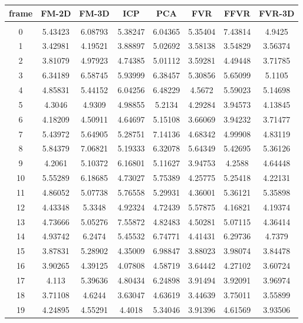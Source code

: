 \begin{center}
\begin{longtable}{cccccccc}
\hline
\textbf{frame} & \textbf{FM-2D} & \textbf{FM-3D} & \textbf{ICP} & \textbf{PCA} & \textbf{FVR} & \textbf{FFVR} & \textbf{FVR-3D} \\
\hline \\
0 & 5.43423 & 6.08793 & 5.38247 & 6.04365 & 5.35404 & 7.43814 & 4.9425\\
1 & 3.42981 & 4.19521 & 3.88897 & 5.02692 & 3.58138 & 3.54829 & 3.56374\\
2 & 3.81079 & 4.97923 & 4.74385 & 5.01112 & 3.59281 & 4.49448 & 3.71785\\
3 & 6.34189 & 6.58745 & 5.93999 & 6.38457 & 5.30856 & 5.65099 & 5.1105\\
4 & 4.85831 & 5.44152 & 6.04256 & 6.48229 & 4.5672 & 5.59023 & 5.14698\\
5 & 4.3046 & 4.9309 & 4.98855 & 5.2134 & 4.29284 & 3.94573 & 4.13845\\
6 & 4.18209 & 4.50911 & 4.64697 & 5.15108 & 3.66069 & 3.94232 & 3.71477\\
7 & 5.43972 & 5.64905 & 5.28751 & 7.14136 & 4.68342 & 4.99908 & 4.83119\\
8 & 5.84379 & 7.06821 & 5.19333 & 6.32078 & 5.64349 & 5.42695 & 5.36126\\
9 & 4.2061 & 5.10372 & 6.16801 & 5.11627 & 3.94753 & 4.2588 & 4.64448\\
10 & 5.55289 & 6.18685 & 4.73027 & 5.75389 & 4.25775 & 5.25418 & 4.22131\\
11 & 4.86052 & 5.07738 & 5.76558 & 5.29931 & 4.36001 & 5.36121 & 5.35898\\
12 & 4.43348 & 5.3348 & 4.92324 & 4.72439 & 5.57875 & 4.16821 & 4.19374\\
13 & 4.73666 & 5.05276 & 7.55872 & 4.82483 & 4.50281 & 5.07115 & 4.36414\\
14 & 4.93742 & 6.2474 & 5.45532 & 6.74771 & 4.41431 & 6.29736 & 4.7379\\
15 & 3.87831 & 5.28902 & 4.35009 & 6.98847 & 3.88023 & 3.98074 & 3.84478\\
16 & 3.90265 & 4.39125 & 4.07808 & 4.58719 & 3.64442 & 4.27102 & 3.60724\\
17 & 4.113 & 5.39636 & 4.80434 & 6.24898 & 3.91494 & 3.92091 & 3.96974\\
18 & 3.71108 & 4.6244 & 3.63047 & 4.63619 & 3.44639 & 3.75011 & 3.55899\\
19 & 4.24895 & 4.55291 & 4.4018 & 5.34046 & 3.91396 & 4.61569 & 3.93506\\

\end{longtable}
\end{center}
